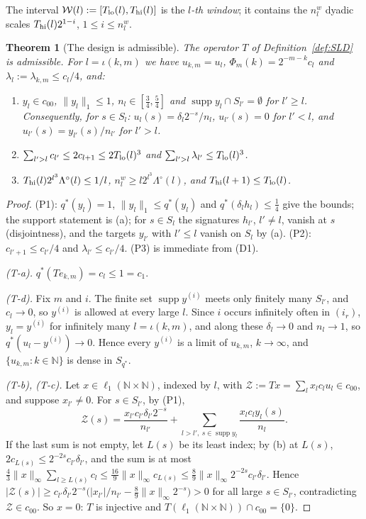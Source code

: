\documentclass[10pt]{amsart}
\newtheorem{theorem}{Theorem}[section]
\theoremstyle{definition}
\theoremstyle{remark}
\newcommand{\supp}{\operatorname{supp}}
\newcommand{\N}{\mathbb N}
\begin{document}
The interval $\mathcal W(l):=[T_{\rm lo}(l),T_{\rm hi}(l)]$ is the
\emph{$l$-th window}; it contains the $n^w_l$ dyadic scales
$T_{\rm hi}(l)2^{1-i}$, $1\le i\le n^w_l$.

\begin{theorem}[The design is admissible]\label{thm:SLD}
The operator $T$ of Definition~\ref{def:SLD} is admissible.  For
$l=\iota(k,m)$ we have $u_{k,m}=u_l$, $\Phi_m(k)=2^{-m-k}c_l$ and
$\lambda_l:=\lambda_{k,m}\le c_l/4$, and:
\begin{enumerate}
\item[(P1)] $y_l\in c_{00}$, $\|y_l\|_1\le1$, $n_l\in[\frac34,\frac54]$ and
$\supp y_l\cap S_{l'}=\emptyset$ for $l'\ge l$.  Consequently, for
$s\in S_l$: $u_l(s)=\delta_l2^{-s}/n_l$, $u_{l'}(s)=0$ for $l'<l$, and
$u_{l'}(s)=y_{l'}(s)/n_{l'}$ for $l'>l$.
\item[(P2)] $\sum_{l'>l}c_{l'}\le2c_{l+1}\le2T_{\rm lo}(l)^3$ and
$\sum_{l'>l}\lambda_{l'}\le T_{\rm lo}(l)^3$.
\item[(P3)] $T_{\rm hi}(l)2^{l^3}\Lambda^\circ(l)\le1/l$,
$n^w_l\ge l2^{l^3}\Lambda^\circ(l)$, and $T_{\rm hi}(l+1)\le T_{\rm lo}(l)$.
\end{enumerate}
\end{theorem}

\begin{proof}
(P1): $q^*(y_l)=1$, $\|y_l\|_1\le q^*(y_l)$ and $q^*(\delta_lh_l)\le\frac14$
give the bounds; the support statement is (a); for $s\in S_l$ the
signatures $h_{l'}$, $l'\ne l$, vanish at $s$ (disjointness), and the targets
$y_{l'}$ with $l'\le l$ vanish on $S_l$ by (a).  (P2): $c_{l'+1}\le
c_{l'}/4$ and $\lambda_{l'}\le c_{l'}/4$.  (P3) is immediate from (D1).

\emph{(T-a).} $q^*(Te_{k,m})=c_l\le1=c_1$.

\emph{(T-d).}  Fix $m$ and $i$.  The finite set $\supp y^{(i)}$ meets only
finitely many $S_{l'}$, and $c_l\to0$, so $y^{(i)}$ is allowed at every
large $l$.  Since $i$ occurs infinitely often in $(i_r)$, $y_l=y^{(i)}$ for
infinitely many $l=\iota(k,m)$, and along these $\delta_l\to0$ and
$n_l\to1$, so $q^*(u_l-y^{(i)})\to0$.  Hence every $y^{(i)}$ is a limit of
$u_{k,m}$, $k\to\infty$, and $\{u_{k,m}:k\in\N\}$ is dense in $S_{q^*}$.

\emph{(T-b), (T-c).}  Let $x\in\ell_1(\N\times\N)$, indexed by $l$, with
$\mathcal Z:=T x=\sum_lx_lc_lu_l\in c_{00}$, and suppose $x_{l'}\ne0$.  For
$s\in S_{l'}$, by (P1),
\[
 \mathcal Z(s)=\frac{x_{l'}c_{l'}\delta_{l'}2^{-s}}{n_{l'}}+\sum_{l>l',\
 s\in\supp y_l}\frac{x_lc_ly_l(s)}{n_l}.
\]
If the last sum is not empty, let $L(s)$ be its least index; by (b) at
$L(s)$, $2c_{L(s)}\le2^{-2s}c_{l'}\delta_{l'}$, and the sum is at most
$\frac43\|x\|_\infty\sum_{l\ge L(s)}c_l\le\frac{16}9\|x\|_\infty c_{L(s)}\le
\frac89\|x\|_\infty2^{-2s}c_{l'}\delta_{l'}$.  Hence $|\mathcal Z(s)|\ge
c_{l'}\delta_{l'}2^{-s}\big(|x_{l'}|/n_{l'}-\frac89\|x\|_\infty2^{-s}\big)>0$
for all large $s\in S_{l'}$, contradicting $\mathcal Z\in c_{00}$.  So
$x=0$: $T$ is injective and $T(\ell_1(\N\times\N))\cap c_{00}=\{0\}$.
\end{proof}
\end{document}
